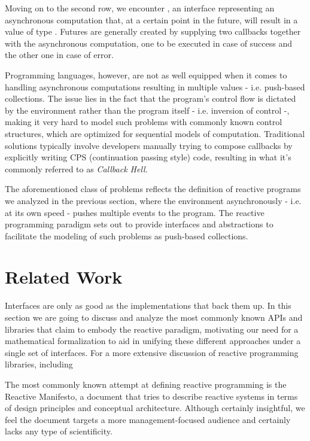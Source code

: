 Moving on to the second row, we encounter , an interface representing an asynchronous computation that, at a certain point in the future, will result in a value of type . Futures are generally created by supplying two callbacks together with the asynchronous computation, one to be executed in case of success and the other one in case of error. 

Programming languages, however, are not as well equipped when it comes to handling asynchronous computations resulting in multiple values - i.e. push-based collections. The issue lies in the fact that the program's control flow is dictated by the environment rather than the program itself - i.e. inversion of control -, making it very hard to model such problems with commonly known control structures, which are optimized for sequential models of computation. Traditional solutions typically involve developers manually trying to compose callbacks by explicitly writing CPS (continuation passing style) code\cite{meijer2015spicing}, resulting in what it's commonly referred to as \textit{Callback Hell}\cite{edwards2009coherent}.

The aforementioned class of problems reflects the definition of reactive programs we analyzed in the previous section, where the environment asynchronously - i.e. at its own speed - pushes multiple events to the program. The reactive programming paradigm sets out to provide interfaces and abstractions to facilitate the modeling of such problems as push-based collections. 

\section{Related Work}

Interfaces are only as good as the implementations that back them up. In this section we are going to discuss and analyze the most commonly known APIs and libraries that claim to embody the reactive paradigm, motivating our need for a mathematical formalization to aid in unifying these different approaches under a single set of interfaces. For a more extensive discussion of reactive programming libraries, including 


The most commonly known attempt at defining reactive programming is the Reactive Manifesto\cite{reactive-manifesto}, a document that tries to describe reactive systems in terms of design principles and conceptual architecture. Although certainly insightful, we feel the document targets a more management-focused audience and certainly lacks any type of scientificity. 

